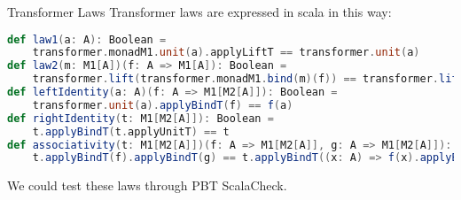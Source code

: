 \begin{frame}[fragile]{Transformer Laws}
	Transformer laws are expressed in scala in this way:
\begin{lstlisting}[language=scala]
def law1(a: A): Boolean = 
	transformer.monadM1.unit(a).applyLiftT == transformer.unit(a)
def law2(m: M1[A])(f: A => M1[A]): Boolean =
	transformer.lift(transformer.monadM1.bind(m)(f)) == transformer.lift(m).applyBindT(transformer.lift[A] _ compose f)
def leftIdentity(a: A)(f: A => M1[M2[A]]): Boolean = 
	transformer.unit(a).applyBindT(f) == f(a)
def rightIdentity(t: M1[M2[A]]): Boolean = 
	t.applyBindT(t.applyUnitT) == t
def associativity(t: M1[M2[A]])(f: A => M1[M2[A]], g: A => M1[M2[A]]): Boolean =
	t.applyBindT(f).applyBindT(g) == t.applyBindT((x: A) => f(x).applyBindT(g))
\end{lstlisting}	
	We could test these laws through PBT ScalaCheck.
\end{frame}